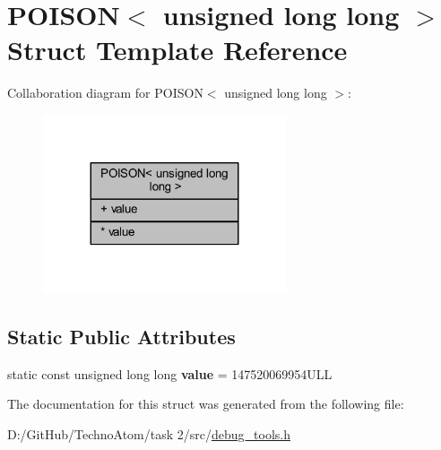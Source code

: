 \hypertarget{struct_p_o_i_s_o_n_3_01unsigned_01long_01long_01_4}{}\section{P\+O\+I\+S\+ON$<$ unsigned long long $>$ Struct Template Reference}
\label{struct_p_o_i_s_o_n_3_01unsigned_01long_01long_01_4}


Collaboration diagram for P\+O\+I\+S\+ON$<$ unsigned long long $>$\+:
\nopagebreak
\begin{figure}[H]
\begin{center}
\leavevmode
\includegraphics[width=203pt]{struct_p_o_i_s_o_n_3_01unsigned_01long_01long_01_4__coll__graph}
\end{center}
\end{figure}
\subsection*{Static Public Attributes}
\textbf{ }\par
\begin{DoxyCompactItemize}
\item 
\mbox{\label{struct_p_o_i_s_o_n_3_01unsigned_01long_01long_01_4_aaeb0e299161215b97c3121c6374c5d24}} 
static const unsigned long long {\bfseries value} = 147520069954\+U\+LL
\end{DoxyCompactItemize}



The documentation for this struct was generated from the following file\+:\begin{DoxyCompactItemize}
\item 
D\+:/\+Git\+Hub/\+Techno\+Atom/task 2/src/\hyperlink{debug__tools_8h}{debug\+\_\+tools.\+h}\end{DoxyCompactItemize}
